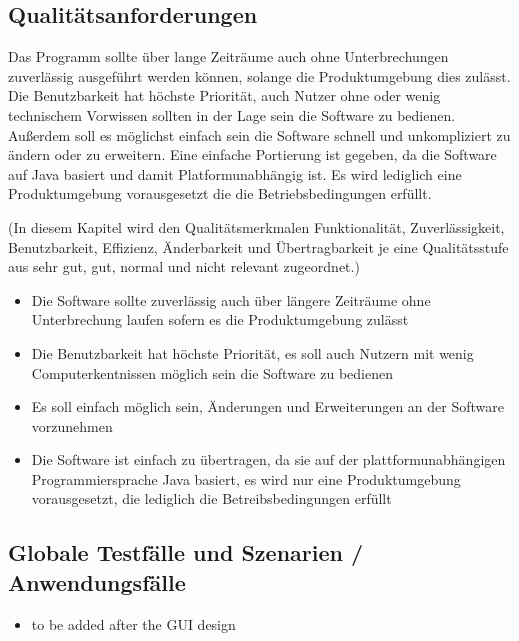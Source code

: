 \documentclass[12 pt]{article}
\begin{document}
\subsection{Qualitätsanforderungen}
Das Programm sollte über lange Zeiträume auch ohne Unterbrechungen zuverlässig ausgeführt werden können, solange die Produktumgebung dies zulässt.
Die Benutzbarkeit hat höchste Priorität, auch Nutzer ohne oder wenig technischem Vorwissen sollten in der Lage sein die Software zu bedienen.
Außerdem soll es möglichst einfach sein die Software schnell und unkompliziert zu ändern oder zu erweitern.
Eine einfache Portierung ist gegeben, da die Software auf Java basiert und damit Platformunabhängig ist. Es wird lediglich eine Produktumgebung vorausgesetzt die die Betriebsbedingungen erfüllt.

(In diesem Kapitel wird den Qualitätsmerkmalen Funktionalität, Zuverlässigkeit, Benutzbarkeit, Effizienz, Änderbarkeit und Übertragbarkeit je eine Qualitätsstufe aus sehr gut, gut, normal und nicht relevant zugeordnet.)
\begin{itemize}
\item Die Software sollte zuverlässig auch über längere Zeiträume ohne Unterbrechung laufen sofern es die Produktumgebung zulässt
\item Die Benutzbarkeit hat höchste Priorität, es soll auch Nutzern mit wenig Computerkentnissen möglich sein die Software zu bedienen
\item Es soll einfach möglich sein, Änderungen und Erweiterungen an der Software vorzunehmen
\item Die Software ist einfach zu übertragen, da sie auf der plattformunabhängigen Programmiersprache Java basiert, es wird nur eine Produktumgebung vorausgesetzt, die lediglich die Betreibsbedingungen erfüllt
\end{itemize}


\subsection{Globale Testfälle und Szenarien / Anwendungsfälle}
\begin{itemize}
\item to be added after the GUI design
\end{itemize}
\end{document}
